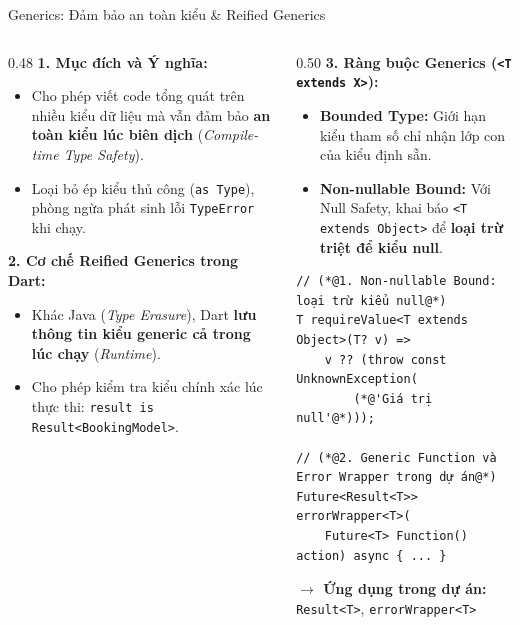 \documentclass[aspectratio=169, 10pt]{beamer}
\begin{document}
\begin{frame}[fragile]{Generics: Đảm bảo an toàn kiểu \& Reified Generics}
\begin{columns}[c,onlytextwidth]
\begin{column}{0.48\textwidth}
\textbf{1. Mục đích và Ý nghĩa:}
\begin{itemize}\setlength{\itemsep}{0.18em}
  \item Cho phép viết code tổng quát trên nhiều kiểu dữ liệu mà vẫn đảm bảo \textbf{an toàn kiểu lúc biên dịch} (\textit{Compile-time Type Safety}).
  \item Loại bỏ ép kiểu thủ công (\texttt{as Type}), phòng ngừa phát sinh lỗi \texttt{TypeError} khi chạy.
\end{itemize}
\vspace{0.2cm}
\textbf{2. Cơ chế Reified Generics trong Dart:}
\begin{itemize}\setlength{\itemsep}{0.18em}
  \item Khác Java (\textit{Type Erasure}), Dart \textbf{lưu thông tin kiểu generic cả trong lúc chạy} (\textit{Runtime}).
  \item Cho phép kiểm tra kiểu chính xác lúc thực thi: \texttt{result is Result<BookingModel>}.
\end{itemize}
\end{column}

\begin{column}{0.50\textwidth}
\textbf{3. Ràng buộc Generics (\texttt{<T extends X>}):}
\begin{itemize}\setlength{\itemsep}{0.12em}
  \item \textbf{Bounded Type:} Giới hạn kiểu tham số chỉ nhận lớp con của kiểu định sẵn.
  \item \textbf{Non-nullable Bound:} Với Null Safety, khai báo \texttt{<T extends Object>} để \textbf{loại trừ triệt để kiểu null}.
\end{itemize}
\vspace{0.08cm}
\begin{lstlisting}[basicstyle=\fontsize{6.8pt}{8.8pt}\selectfont\ttfamily, columns=flexible]
// (*@1. Non-nullable Bound: loại trừ kiểu null@*)
T requireValue<T extends Object>(T? v) =>
    v ?? (throw const UnknownException(
        (*@'Giá trị null'@*)));

// (*@2. Generic Function và Error Wrapper trong dự án@*)
Future<Result<T>> errorWrapper<T>(
    Future<T> Function() action) async { ... }
\end{lstlisting}
\vspace{0.10cm}
{\scriptsize \textbf{$\rightarrow$ Ứng dụng trong dự án:} \texttt{Result<T>}, \texttt{errorWrapper<T>}}
\end{column}
\end{columns}
\end{frame}
\end{document}
